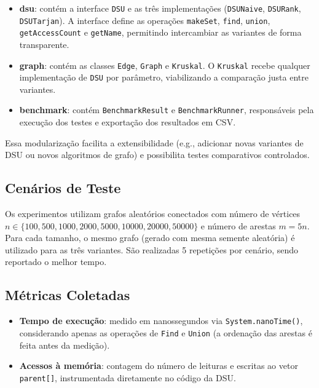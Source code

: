 \documentclass[12pt]{article}
\begin{document}
\begin{itemize}
    \item \textbf{dsu}: contém a interface \texttt{DSU} e as três implementações (\texttt{DSUNaive}, \texttt{DSURank}, \texttt{DSUTarjan}). A interface define as operações \texttt{makeSet}, \texttt{find}, \texttt{union}, \texttt{getAccessCount} e \texttt{getName}, permitindo intercambiar as variantes de forma transparente.
    \item \textbf{graph}: contém as classes \texttt{Edge}, \texttt{Graph} e \texttt{Kruskal}. O \texttt{Kruskal} recebe qualquer implementação de \texttt{DSU} por parâmetro, viabilizando a comparação justa entre variantes.
    \item \textbf{benchmark}: contém \texttt{BenchmarkResult} e \texttt{BenchmarkRunner}, responsáveis pela execução dos testes e exportação dos resultados em CSV.
\end{itemize}

Essa modularização facilita a extensibilidade (e.g., adicionar novas variantes de DSU ou novos algoritmos de grafo) e possibilita testes comparativos controlados.

\subsection{Cenários de Teste}

Os experimentos utilizam grafos aleatórios conectados com número de vértices $n \in \{100, 500, 1000, 2000, 5000, 10000, 20000, 50000\}$ e número de arestas $m = 5n$. Para cada tamanho, o mesmo grafo (gerado com mesma semente aleatória) é utilizado para as três variantes. São realizadas 5 repetições por cenário, sendo reportado o melhor tempo.

\subsection{Métricas Coletadas}

\begin{itemize}
    \item \textbf{Tempo de execução}: medido em nanossegundos via \texttt{System.nanoTime()}, considerando apenas as operações de \texttt{Find} e \texttt{Union} (a ordenação das arestas é feita antes da medição).
    \item \textbf{Acessos à memória}: contagem do número de leituras e escritas ao vetor \texttt{parent[]}, instrumentada diretamente no código da DSU.
\end{itemize}
\end{document}
